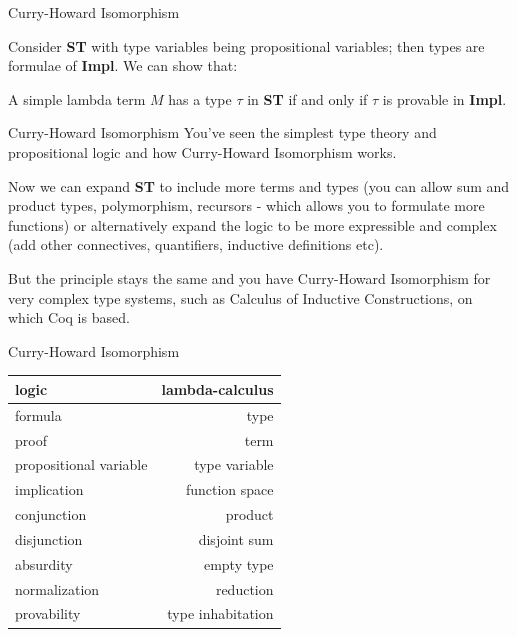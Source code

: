\documentclass[10pt]{beamer}
\begin{document}
\begin{frame}{Curry-Howard Isomorphism}

  Consider {\bf ST} with type variables being propositional variables; then types are formulae of {\bf Impl}. We can show that:
\begin{theorem}[CHI]
  A simple lambda term $M$ has a type $\tau$ in {\bf ST} if and only if $\tau$ is provable in {\bf Impl}.
  \end{theorem}
\end{frame}


      

      

    

\begin{frame}{Curry-Howard Isomorphism}
             You've seen the simplest type theory and propositional logic and how Curry-Howard Isomorphism works.
    
             Now we can expand {\bf ST} to include more terms and types (you can allow sum and product types, polymorphism, recursors - which allows you to formulate more functions) or alternatively expand the logic to be more expressible and complex (add other
             connectives, quantifiers, inductive definitions etc).
    
             But the principle stays the same and you have Curry-Howard Isomorphism for very complex type systems, such as Calculus of Inductive Constructions, on which Coq is based. 
\end{frame}

\begin{frame}{Curry-Howard Isomorphism}
       
       \begin{tabular}{ l | r }
         {\bf logic } & {\bf lambda-calculus} \\
         \hline
         formula & type  \\
         proof & term \\
         propositional variable & type variable  \\
         implication & function space  \\
         conjunction & product \\
         disjunction & disjoint sum \\
         absurdity & empty type \\
         normalization & reduction \\
         provability & type inhabitation \\      
       \end{tabular}
\end{frame}
       
\end{document}

